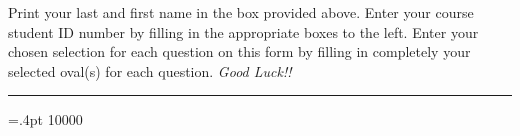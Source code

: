 \documentclass[
    11pt,
    titlepage,
]{scrartcl}
\begin{document}
\begin{examcopy}[2]
    \null\hfill\parbox[c]{0.9\linewidth}{
        Print your last and first name in the box provided above.
        Enter your course student ID number by filling in
            the appropriate boxes to the left.
        Enter your chosen selection for each question on this
            form by filling in completely your selected oval(s) for each question.
        \emph{Good Luck!!}
    }\hfill\null

    \rule[0pt]{\linewidth}{0.5pt}

    \begin{multicols}{3}
        \columnseprule=.4pt
         10000
        \AMCform
    \end{multicols}
    \clearpage
    
    \AMCcleardoublepage
\end{examcopy}
\end{document}
